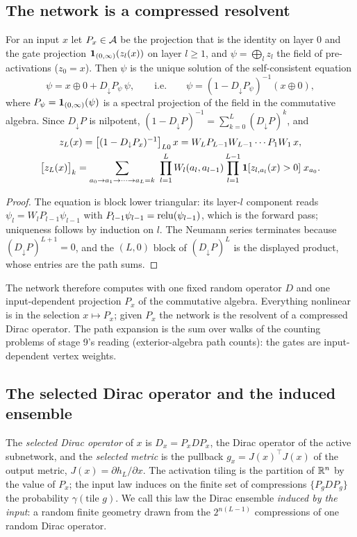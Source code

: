 \subsection{The network is a compressed resolvent}
\begin{theorem}\label{thm:resolvent}
For an input $x$ let $P_x\in\mathcal A$ be the projection that is the identity on layer $0$ and the gate projection
$\mathbf 1_{(0,\infty)}(z_l(x))$ on layer $l\ge1$, and $\psi=\bigoplus_lz_l$ the field of pre-activations ($z_0=x$). Then $\psi$ is
the unique solution of the self-consistent equation
\[
\psi=x\oplus0+D_\downarrow P_\psi\,\psi,\qquad\text{i.e.}\qquad \psi=(1-D_\downarrow P_\psi)^{-1}(x\oplus0),
\]
where $P_\psi=\mathbf 1_{(0,\infty)}(\psi)$ is a spectral projection of the field in the commutative algebra. Since
$D_\downarrow P$ is nilpotent, $(1-D_\downarrow P)^{-1}=\sum_{k=0}^{L}(D_\downarrow P)^k$, and
\begin{gather*}
z_L(x)=\big[(1-D_\downarrow P_x)^{-1}\big]_{L0}\,x=W_LP_{L-1}W_{L-1}\cdots P_1W_1\,x,\\
\big[z_L(x)\big]_k=\sum_{a_0\to a_1\to\cdots\to a_L=k}\ \prod_{l=1}^LW_l(a_l,a_{l-1})\prod_{l=1}^{L-1}\1[z_{l,a_l}(x)>0]\;x_{a_0}.
\end{gather*}
\end{theorem}
\begin{proof}
The equation is block lower triangular: its layer-$l$ component reads $\psi_l=W_lP_{l-1}\psi_{l-1}$ with
$P_{l-1}\psi_{l-1}=\operatorname{relu}(\psi_{l-1})$, which is the forward pass; uniqueness follows by induction on $l$. The Neumann
series terminates because $(D_\downarrow P)^{L+1}=0$, and the $(L,0)$ block of $(D_\downarrow P)^L$ is the displayed
product, whose entries are the path sums.
\end{proof}

The network therefore computes with one fixed random operator $D$ and one input-dependent projection $P_x$ of the
commutative algebra. Everything nonlinear is in the selection $x\mapsto P_x$; given $P_x$ the network is the
resolvent of a compressed Dirac operator. The path expansion is the sum over walks of the counting problems of
stage 9's reading (exterior-algebra path counts): the gates are input-dependent vertex weights.

\subsection{The selected Dirac operator and the induced ensemble}
\begin{definition}[Selection]\label{def:selection}
The \emph{selected Dirac operator} of $x$ is $D_x=P_xDP_x$, the Dirac operator of the active subnetwork, and the
\emph{selected metric} is the pullback $g_x=J(x)^{\top}J(x)$ of the output metric, $J(x)=\partial h_L/\partial x$.
The activation tiling is the partition of $\mathbb R^n$ by the value of $P_x$; the input law induces on the finite set of
compressions $\{P_gDP_g\}$ the probability $\gamma(\text{tile }g)$. We call this law the Dirac ensemble \emph{induced
by the input}: a random finite geometry drawn from the $2^{n(L-1)}$ compressions of one random Dirac operator.
\end{definition}


